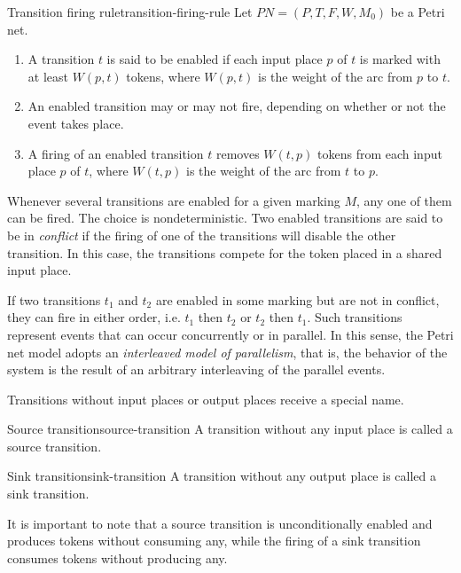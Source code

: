 \documentclass[../Thesis.tex]{subfiles}
\begin{document}
\begin{definition}{Transition firing rule}{transition-firing-rule}
    Let $ PN = (P, T, F, W, M_{0}) $ be a Petri net.
    \begin{enumerate}[label=(\roman*)]
        \item A transition $t$ is said to be enabled if each input place $p$ of $t$
              is marked with at least $W(p, t)$ tokens,
              where $W(p,t)$ is the weight of the arc from $p$ to $t$.
        \item An enabled transition may or may not fire,
              depending on whether or not the event takes place.
        \item A firing of an enabled transition $t$ removes
              $W(t,p)$ tokens from each input place $p$ of $t$,
              where $W(t, p)$ is the weight of the arc from $t$ to $p$.
    \end{enumerate}
\end{definition}

Whenever several transitions are enabled for a given marking $M$,
any one of them can be fired.
The choice is nondeterministic.
Two enabled transitions are said to be in \emph{conflict}
if the firing of one of the transitions will disable the other transition.
In this case, the transitions compete for the token placed in a shared input place.

If two transitions $t_1$ and $t_2$ are enabled in some marking but are not in conflict,
they can fire in either order, i.e. $t_1$ then $t_2$ or $t_2$ then $t_1$.
Such transitions represent events that can occur concurrently or in parallel.
In this sense, the Petri net model adopts an \emph{interleaved model of parallelism}, that is,
the behavior of the system is the result of an arbitrary interleaving of the parallel events.

Transitions without input places or output places receive a special name.

\begin{definition}{Source transition}{source-transition}
    A transition without any input place is called a source transition.
\end{definition}

\begin{definition}{Sink transition}{sink-transition}
    A transition without any output place is called a sink transition.
\end{definition}

It is important to note that a source transition is unconditionally enabled
and produces tokens without consuming any, while the firing of a sink transition
consumes tokens without producing any.
\end{document}
